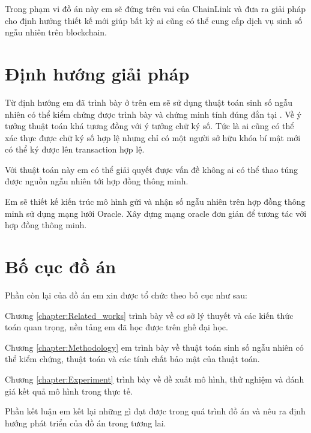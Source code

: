 \documentclass[../main.tex]{subfiles}
\begin{document}
Trong phạm vi đồ án này em sẽ đứng trên vai của ChainLink và đưa ra giải pháp cho định hướng thiết kế mới giúp bất kỳ ai cũng có thể cung cấp dịch vụ sinh số ngẫu nhiên trên blockchain.
\section{Định hướng giải pháp}
Từ định hướng em đã trình bày ở trên em sẽ sử dụng thuật toán sinh số ngẫu nhiên có thể kiểm chứng được trình bày và chứng minh tính đúng đắn tại \cite{papadopoulos2017making}. Về ý tưởng thuật toán khá tương đồng với ý tưởng chữ ký số. Tức là ai cũng có thể xác thực được chữ ký số hợp lệ nhưng chỉ có một người sở hữu khóa bí mật mới có thể ký được lên transaction hợp lệ. 

Với thuật toán này em có thể giải quyết được vấn đề không ai có thể thao túng được nguồn ngẫu nhiên tới hợp đồng thông minh. 

Em sẽ thiết kế kiến trúc mô hình gửi và nhận số ngẫu nhiên trên hợp đồng thông minh sử dụng mạng lưới Oracle. Xây dựng mạng oracle đơn giản để tương tác với hợp đồng thông minh.
\section{Bố cục đồ án}
Phần còn lại của đồ án em xin được tổ chức theo bố cục như sau:

Chương \ref{chapter:Related_works} trình bày về cơ sở lý thuyết và các kiến thức toán quan trọng, nền tảng em đã học được trên ghế đại học.

Chương \ref{chapter:Methodology} em trình bày về thuật toán sinh số ngẫu nhiên có thể kiểm chứng, thuật toán và các tính chất bảo mật của thuật toán.

Chương \ref{chapter:Experiment} trình bày về đề xuất mô hình, thử nghiệm và đánh giá kết quả mô hình trong thực tế.

Phần kết luận em kết lại những gì đạt được trong quá trình đồ án và nêu ra định hướng phát triển của đồ án trong tương lai.
\end{document}
